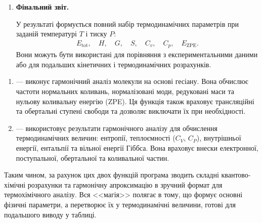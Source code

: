 \begin{enumerate}
    ZPE є сумою $\tfrac{1}{2} h\nu_k$ для всіх нормальних мод:
    \begin{equation}
        E_\text{ZPE} = \frac{1}{2} \sum_k h \nu_k.
    \end{equation}

    У коді:
    \begin{verbatim}
    ZPE_kJ = results['ZPE'][0] * Ha2kJ
    \end{verbatim}

    Це відповідає квантовій поправці до енергії основного стану молекули, яка відсутня в чисто електронному розрахунку Хартрі–Фока.

    \item \textbf{Фінальний звіт.}

    У результаті формується повний набір термодинамічних параметрів при заданій температурі $T$ і тиску $P$:
    \begin{align*}
        E_\text{tot}, \quad H, \quad G, \quad S, \quad C_v, \quad C_p, \quad E_\text{ZPE}.
    \end{align*}
    Вони можуть бути використані для порівняння з експериментальними даними або для подальших кінетичних і термодинамічних розрахунків.
\end{enumerate}


\begin{enumerate}
  \item {} --- виконує гармонічний аналіз молекули на основі гесіану.
        Вона обчислює частоти нормальних коливань, нормалізовані моди, редуковані маси та нульову коливальну енергію (ZPE).
        Ця функція також враховує трансляційні та обертальні ступені свободи та дозволяє виключати їх при необхідності.
  \item {} --- використовує результати гармонічного аналізу для обчислення термодинамічних величин:
        ентропії, теплоємності ($C_V$, $C_P$), внутрішньої енергії, ентальпії та вільної енергії Гіббса.
        Вона враховує внески електронної, поступальної, обертальної та коливальної частин.
\end{enumerate}

Таким чином, за рахунок цих двох функцій програма зводить складні квантово-хімічні розрахунки та гармонічну апроксимацію в зручний формат для термохімічного аналізу.
Вся <<магія>> полягає в тому, що  формує основні фізичні параметри, а  перетворює їх у термодинамічні величини, готові для подальшого виводу у таблиці.



